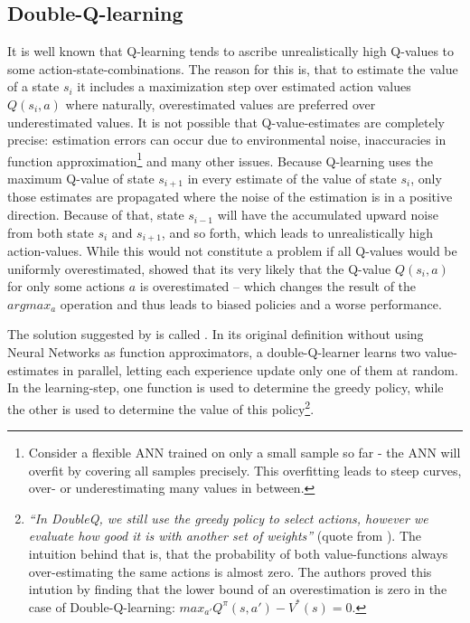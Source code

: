 \subsection{Double-Q-learning}
It is well known that Q-learning tends to ascribe unrealistically high Q-values to some action-state-combinations. The reason for this is, that to estimate the value of a state $s_i$ it includes a maximization step over estimated action values $Q(s_i,a)$ where naturally, overestimated values are preferred over underestimated values. 
It is not possible that Q-value-estimates are completely precise: estimation errors can occur due to environmental noise, inaccuracies in function approximation\footnote{Consider a flexible ANN trained on only a small sample so far - the ANN will overfit by covering all samples precisely. This overfitting leads to steep curves, over- or underestimating many values in between.} and many other issues. Because Q-learning uses the maximum Q-value of state $s_{i+1}$ in every estimate of the value of state $s_i$, only those estimates are propagated where the noise of the estimation is in a positive direction. Because of that, state $s_{i-1}$ will have the accumulated upward noise from both state $s_i$ and $s_{i+1}$, and so forth, which leads to unrealistically high action-values. While this would not constitute a problem if all Q-values would be uniformly overestimated, \cite{van_hasselt_deep_2015} showed that its very likely that the Q-value $Q(s_i,a)$ for only some actions $a$ is overestimated -- which changes the result of the $argmax_a$ operation and thus leads to biased policies and a worse performance.

The solution suggested by \cite{van_hasselt_deep_2015} is called . In its original definition without using Neural Networks as function approximators, a double-Q-learner learns two value-estimates in parallel, letting each experience update only one of them at random. In the learning-step, one function is used to determine the greedy policy, while the other is used to determine the value of this policy\footnote{\textit{``In DoubleQ, we still use the greedy policy to select actions, however we evaluate how good it is with another set of weights''} (quote from \cite{van_hasselt_deep_2015}). The intuition behind that is, that the probability of both value-functions always over-estimating the same actions is almost zero. The authors proved this intution by finding that the lower bound of an overestimation is zero in the case of Double-Q-learning: $max_{a'}Q^\pi(s,a') - V^*(s) = 0$.}.\\

